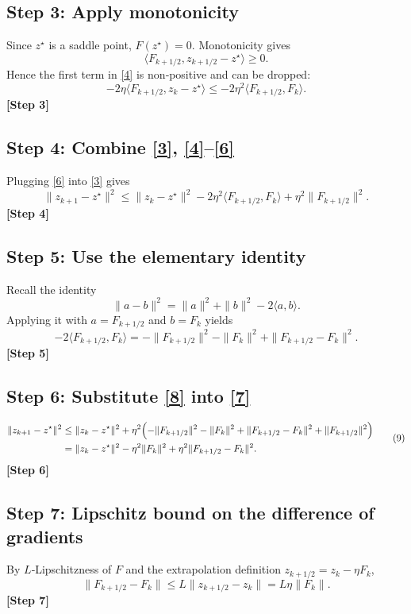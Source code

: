 \documentclass{article}
\begin{document}
\subsection*{Step 3: Apply monotonicity}
Since $z^{\star}$ is a saddle point, $F(z^{\star})=0$. Monotonicity gives
\[
\langle F_{k+1/2},z_{k+1/2}-z^{\star}\rangle\ge 0.
\tag{5}
\]
Hence the first term in \eqref{4} is non‑positive and can be dropped:
\[
-2\eta\langle F_{k+1/2},z_k-z^{\star}\rangle
\le -2\eta^{2}\langle F_{k+1/2},F_k\rangle .
\tag{6}
\]
\textbf{[Step 3]}

\subsection*{Step 4: Combine \eqref{3}, \eqref{4}–\eqref{6}}
Plugging \eqref{6} into \eqref{3} gives
\[
\|z_{k+1}-z^{\star}\|^{2}
\le \|z_k-z^{\star}\|^{2}
 -2\eta^{2}\langle F_{k+1/2},F_k\rangle
 +\eta^{2}\|F_{k+1/2}\|^{2}.
\tag{7}
\]
\textbf{[Step 4]}

\subsection*{Step 5: Use the elementary identity}
Recall the identity
\[
\|a-b\|^{2}= \|a\|^{2}+\|b\|^{2}-2\langle a,b\rangle .
\]
Applying it with $a=F_{k+1/2}$ and $b=F_k$ yields
\[
-2\langle F_{k+1/2},F_k\rangle
 =-\|F_{k+1/2}\|^{2}-\|F_k\|^{2}
   +\|F_{k+1/2}-F_k\|^{2}.
\tag{8}
\]
\textbf{[Step 5]}

\subsection*{Step 6: Substitute \eqref{8} into \eqref{7}}
\[
\begin{aligned}
\|z_{k+1}-z^{\star}\|^{2}
&\le \|z_k-z^{\star}\|^{2}
+\eta^{2}\Bigl(
   -\|F_{k+1/2}\|^{2}-\|F_k\|^{2}
   +\|F_{k+1/2}-F_k\|^{2}
   +\|F_{k+1/2}\|^{2}
   \Bigr)\\
&= \|z_k-z^{\star}\|^{2}
-\eta^{2}\|F_k\|^{2}
+\eta^{2}\|F_{k+1/2}-F_k\|^{2}.
\end{aligned}
\tag{9}
\]
\textbf{[Step 6]}

\subsection*{Step 7: Lipschitz bound on the difference of gradients}
By $L$‑Lipschitzness of $F$ and the extrapolation definition $z_{k+1/2}=z_k-\eta F_k$,
\[
\|F_{k+1/2}-F_k\|\le L\|z_{k+1/2}-z_k\|
 =L\eta\|F_k\|.
\tag{10}
\]
\textbf{[Step 7]}
\end{document}
